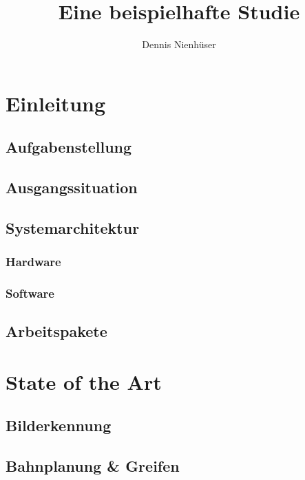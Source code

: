 \documentclass[de,ids]{fziartcl}
\author{Dennis Nienhüser}
\title{Eine beispielhafte Studie}
\begin{document}
\maketitle

\tableofcontents
\newpage

\section{Einleitung} %
\subsection{Aufgabenstellung}
\subsection{Ausgangssituation}
\subsection{Systemarchitektur}
\subsubsection{Hardware} %

\subsubsection{Software}
\subsection{Arbeitspakete} %

\section{State of the Art} %
\subsection{Bilderkennung}
\subsection{Bahnplanung \& Greifen}
\end{document}
